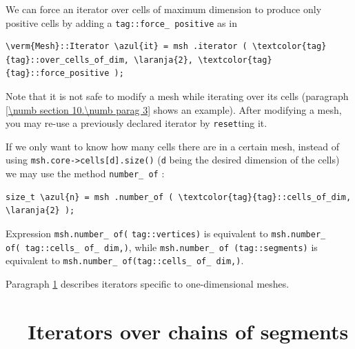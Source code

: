 We can force an iterator over cells of maximum dimension to produce only positive cells
by adding a {\small\tt \textcolor{tag}{tag}::force\_\,positive} as in

\begin{Verbatim}[commandchars=\\\{\},formatcom=\small\tt,
   baselinestretch=0.94,framesep=2mm                      ]
   \verm{Mesh}::Iterator \azul{it} = msh .iterator ( \textcolor{tag}{tag}::over_cells_of_dim, \laranja{2}, \textcolor{tag}{tag}::force_positive );
\end{Verbatim}

Note that it is not safe to modify a mesh while iterating over its cells
(paragraph \ref{\numb section 10.\numb parag 3} shows an example).
After modifying a mesh, you may re-use a previously declared iterator by {\small\tt reset}ting it.

If we only want to know how many cells there are in a certain mesh,
instead of using {\small\tt msh.core->cells[d].size()} ({\small\tt d} being the desired
dimension of the cells) we may use the method {\small\tt number\_\,of} :

\begin{Verbatim}[commandchars=\\\{\},formatcom=\small\tt,
   baselinestretch=0.94,framesep=2mm                      ]
   size_t \azul{n} = msh .number_of ( \textcolor{tag}{tag}::cells_of_dim, \laranja{2} );
\end{Verbatim}

\noindent Expression {\small\tt msh.number\_\,of}\hskip1pt{\small\tt (}\hskip1pt
{\small\tt \textcolor{tag}{tag}::vertices}\hskip1pt{\small\tt )} is equivalent to
\hbox{{\small\tt msh.number\_\,of}\hskip1pt{\small\tt (}\hskip1pt
{\small\tt \textcolor{tag}{tag}::cells\_\,of\_\,dim,}\hskip1pt{\small\tt{}}\hskip1pt{\small\tt )}},
while {\small\tt msh.number\_\,of}\hskip2pt{\small\tt
(}\hskip2pt{\small\tt \textcolor{tag}{tag}::segments}\hskip2pt{\small\tt )} is equivalent to
{\small\tt msh.number\_\,of}\hskip2pt{\small\tt (}\hskip2pt{\small\tt \textcolor{tag}{tag}::cells\_\,of\_\,dim,}\hskip2pt{\small\tt{}}\hskip2pt{\small\tt )}.

Paragraph \ref{\numb section 9.\numb parag 4} describes iterators specific to one-dimensional
meshes.


\section{~~Iterators over chains of segments}\label{\numb section 9.\numb parag 4}

